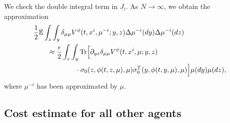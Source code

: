 \documentclass{amsart}
\theoremstyle{definition}
\theoremstyle{remark}
\def\EE{{\mathbb E}}
\def\deltae{\epsilon}
\numberwithin{equation}{section}
\begin{document}
We  check the double integral term in  $J_i$.
As $N\to \infty$,  we obtain the approximation
\begin{align*}
&  \frac{1}{2}\EE\int_z\int_y \delta_{\mu\mu} V^\phi (t, x^i, \mu^{-i}; y,z)\Delta \mu^{-i} (dy) \Delta\mu^{-i} (dz)\\
 &\qquad \approx
 \frac{\deltae}{2}\int_z\int_y {\rm Tr}\Big[\partial_{yz}\delta_{\mu\mu} V^\phi (t, x^i, \mu; y,z)\\
&\qquad\qquad\qquad\cdot
\sigma_0(z,\phi(t,z,\mu),\mu)\sigma_0^T(y,\phi(t,y,\mu),\mu)\Big]\mu(dy)\mu(dz),
\end{align*}
where $\mu^{-i}$ has been approximated by $\mu$.




\subsection{Cost estimate for all other agents}
\end{document}
